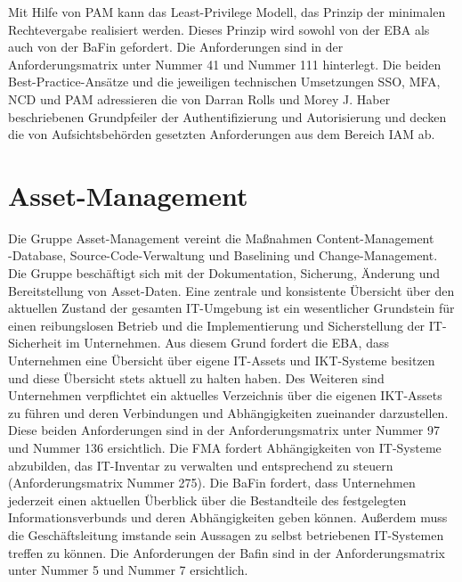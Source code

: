 Mit Hilfe von PAM kann das \glqq{}Least-Privilege\grqq{} Modell, das Prinzip der minimalen Rechtevergabe realisiert werden. Dieses Prinzip wird sowohl von der EBA als auch von der BaFin gefordert. Die Anforderungen sind in der Anforderungsmatrix unter Nummer 41 und Nummer 111 hinterlegt. 
\bigbreak
Die beiden Best-Practice-Ansätze und die jeweiligen technischen Umsetzungen SSO, MFA, NCD und PAM adressieren die von Darran Rolls und Morey J. Haber beschriebenen Grundpfeiler der Authentifizierung und Autorisierung und decken die von Aufsichtsbehörden gesetzten Anforderungen aus dem Bereich IAM ab. 

\section{Asset-Management}
Die Gruppe \glqq{}Asset-Management\grqq{} vereint die Maßnahmen \glqq{}Content-Management\\-Database\grqq{}, \glqq{}Source-Code-Verwaltung\grqq{} und \glqq{}Baselining und Change-Management\grqq{}. Die Gruppe beschäftigt sich mit der Dokumentation, Sicherung, Änderung und Bereitstellung von Asset-Daten. 
\bigbreak
Eine zentrale und konsistente Übersicht über den aktuellen Zustand der gesamten IT-Umgebung ist ein wesentlicher Grundstein für einen reibungslosen Betrieb und die Implementierung und Sicherstellung der IT-Sicherheit im Unternehmen. Aus diesem Grund fordert die EBA, dass Unternehmen eine Übersicht über eigene IT-Assets und IKT-Systeme besitzen und diese Übersicht stets aktuell zu halten haben. Des Weiteren sind Unternehmen verpflichtet ein aktuelles Verzeichnis über die eigenen IKT-Assets zu führen und deren Verbindungen und Abhängigkeiten zueinander darzustellen. Diese beiden Anforderungen sind in der Anforderungsmatrix unter Nummer 97 und Nummer 136 ersichtlich. Die FMA fordert Abhängigkeiten von IT-Systeme abzubilden, das IT-Inventar zu verwalten und entsprechend zu steuern (Anforderungsmatrix Nummer 275). Die BaFin fordert, dass Unternehmen jederzeit einen aktuellen Überblick über die Bestandteile des festgelegten Informationsverbunds und deren Abhängigkeiten geben können. Außerdem muss die Geschäftsleitung imstande sein Aussagen zu selbst betriebenen IT-Systemen treffen zu können. Die Anforderungen der Bafin sind in der Anforderungsmatrix unter Nummer 5 und Nummer 7 ersichtlich. 

